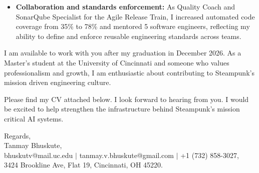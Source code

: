 \documentclass[11pt]{letter}
\begin{document}
\begin{letter}{}
\begin{itemize}[leftmargin=*, itemsep=0.45em]
    \item \textbf{Collaboration and standards enforcement:} As Quality Coach and SonarQube Specialist for the Agile Release Train, I increased automated code coverage from 35\% to 78\% and mentored 5 software engineers, reflecting my ability to define and enforce reusable engineering standards across teams.
\end{itemize}

I am available to work with you after my graduation in December 2026. As a Master's student at the University of Cincinnati and someone who values professionalism and growth, I am enthusiastic about contributing to Steampunk's mission driven engineering culture.

Please find my CV attached below. I look forward to hearing from you. I would be excited to help strengthen the infrastructure behind Steampunk's mission critical AI systems.

{\setlength{\parskip}{0pt}
Regards,\\
Tanmay Bhuskute,\\
bhuskutv@mail.uc.edu $\mid$ tanmay.v.bhuskute@gmail.com $\mid$ +1 (732) 858-3027,\\
3424 Brookline Ave, Flat 19, Cincinnati, OH 45220.
}

\end{letter}
\end{document}
